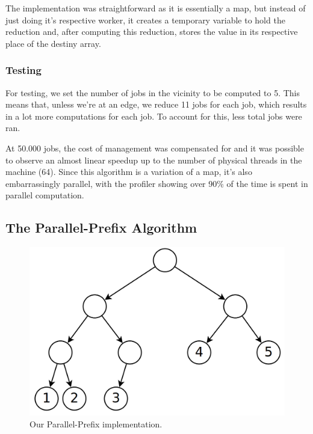 \documentclass[10pt,journal]{IEEEtran}
\begin{document}
The implementation was straightforward as it is essentially a map, but instead of just doing it's respective worker, it creates a temporary variable to hold the reduction and, after computing this reduction, stores the value in its respective place of the destiny array.

\subsubsection{Testing}

For testing, we set the number of jobs in the vicinity to be computed to 5. This means that, unless we're at an edge, we reduce 11 jobs for each job, which results in a lot more computations for each job. To account for this, less total jobs were ran. 

At 50.000 jobs, the cost of management was compensated for and it was possible to observe an almost linear speedup up to the number of physical threads in the machine (64). Since this algorithm is a variation of a map, it's also embarrassingly parallel, with the profiler showing over 90\% of the time is spent in parallel computation.

\subsection{The Parallel-Prefix Algorithm}

\begin{figure}[htbp]
	\centerline{\includegraphics[scale=0.10]{img/parprefix.png}}
	\caption{ Our Parallel-Prefix implementation.  }
	\label{parprefixpic}
\end{figure}
\end{document}

